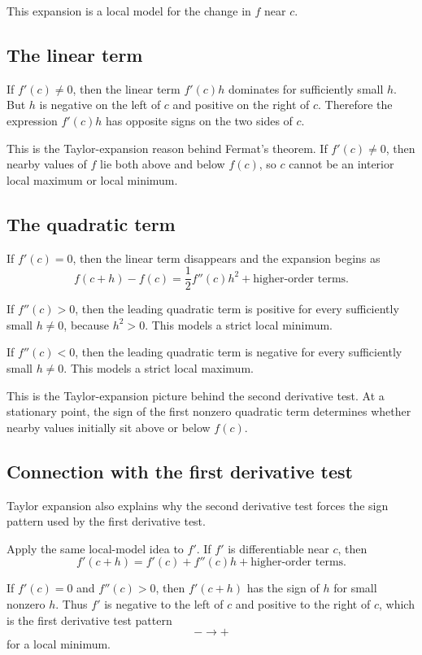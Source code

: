 \documentclass{essay}
\begin{document}
This expansion is a local model for the change in \(f\) near \(c\).

\subsection{The linear term}

If \(f'(c)\neq0\), then the linear term \(f'(c)h\) dominates for sufficiently small \(h\). But \(h\) is negative on the left of \(c\) and positive on the right of \(c\). Therefore the expression \(f'(c)h\) has opposite signs on the two sides of \(c\).

This is the Taylor-expansion reason behind Fermat's theorem. If \(f'(c)\neq0\), then nearby values of \(f\) lie both above and below \(f(c)\), so \(c\) cannot be an interior local maximum or local minimum.

\subsection{The quadratic term}

If \(f'(c)=0\), then the linear term disappears and the expansion begins as
\[
f(c+h)-f(c)
=
\frac12 f''(c)h^2
+
\text{higher-order terms}.
\]

If \(f''(c)>0\), then the leading quadratic term is positive for every sufficiently small \(h\neq0\), because \(h^2>0\).
This models a strict local minimum.

If \(f''(c)<0\), then the leading quadratic term is negative for every sufficiently small \(h\neq0\). This models a strict local maximum.

This is the Taylor-expansion picture behind the second derivative test. At a stationary point, the sign of the first nonzero quadratic term determines whether nearby values initially sit above or below \(f(c)\).

\subsection{Connection with the first derivative test}

Taylor expansion also explains why the second derivative test forces the sign pattern used by the first derivative test.

Apply the same local-model idea to \(f'\). If \(f'\) is differentiable near \(c\), then
\[
f'(c+h)
=
f'(c)
+
f''(c)h
+
\text{higher-order terms}.
\]

If \(f'(c)=0\) and \(f''(c)>0\), then \(f'(c+h)\) has the sign of \(h\) for small nonzero \(h\). Thus \(f'\) is negative to the left of \(c\) and positive to the right of \(c\), which is the first derivative test pattern
\[
-\longrightarrow +
\]
for a local minimum.
\end{document}
